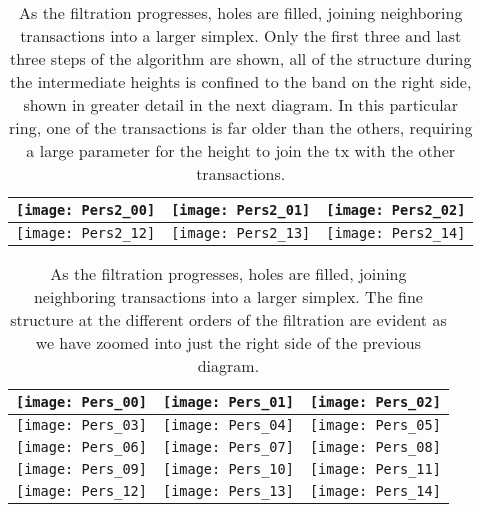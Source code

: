 \begin{center}
\begin{table}
\begin{tabular}{|c|c|c|}

\hline
 \texttt{[image: Pers2\_00]} & \texttt{[image: Pers2\_01]} & \texttt{[image: Pers2\_02]} \\ \hline
  \texttt{[image: Pers2\_12]} & \texttt{[image: Pers2\_13]} & \texttt{[image: Pers2\_14]} \\ \hline
\end{tabular}
\caption{As the filtration progresses, holes are filled, joining neighboring transactions into a larger simplex.  Only the first three and last three steps of the algorithm are shown, all of the structure during the intermediate heights is confined to the band on the right side, shown in greater detail in the next diagram. 
In this particular ring, one of the transactions is far older than the others, requiring a large parameter for the height to join the tx with the other transactions.}
\label{tab:pers2}
\end{table}
\end{center}

\begin{center}
\begin{table}
\begin{tabular}{|c|c|c|}
\hline
 \texttt{[image: Pers\_00]} & \texttt{[image: Pers\_01]} & \texttt{[image: Pers\_02]} \\ \hline
  \texttt{[image: Pers\_03]} & \texttt{[image: Pers\_04]} & \texttt{[image: Pers\_05]} \\ \hline
 \texttt{[image: Pers\_06]} & \texttt{[image: Pers\_07]} & \texttt{[image: Pers\_08]} \\ \hline
 \texttt{[image: Pers\_09]} & \texttt{[image: Pers\_10]} & \texttt{[image: Pers\_11]} \\ \hline
  \texttt{[image: Pers\_12]} & \texttt{[image: Pers\_13]} & \texttt{[image: Pers\_14]} \\ \hline
\end{tabular}
\caption{
As the filtration progresses, holes are filled, joining neighboring transactions into a larger simplex.  The fine structure at the different orders of the filtration are evident as we have zoomed into just the right side of the previous diagram.}
\label{tab:pers}
\end{table}
\end{center}


